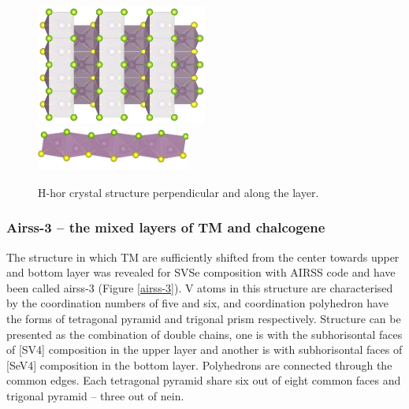 \documentclass[a4paperm]{article}
\begin{document}
\begin{figure}[H]
	\includegraphics[width=0.5\textwidth]{H_hor_1.jpg} \\
	\includegraphics[width=0.45\textwidth]{H_hor_2.jpg}
	\caption{H-hor crystal structure perpendicular and along the layer.}
\label{H_hor}
\end{figure} 





\subsubsection{ Airss-3 – the mixed layers of TM and chalcogene}

The structure in which TM are sufficiently shifted from the center towards upper and bottom layer was revealed for SVSe composition with AIRSS code and have been called airss-3 (Figure \ref{airss-3}).
V atoms in this structure are characterised by the coordination numbers of five and six, and coordination polyhedron have the forms of tetragonal pyramid and trigonal prism respectively.
Structure can be presented as the combination of double chains, one is with the subhorisontal faces of [SV4] composition in the upper layer and another is with subhorisontal faces of [SeV4] composition in the bottom layer.
Polyhedrons are connected through the common edges.
Each tetragonal pyramid share six out of eight common faces and trigonal pyramid – three out of nein.
\end{document}
